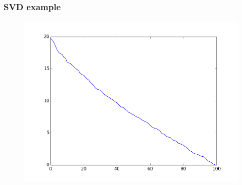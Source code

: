 \documentclass{beamer}
\begin{document}
\begin{frame}
\frametitle{SVD example}


\begin{figure}
\includegraphics[scale=0.25]{figs/svd_plot.png}
\end{figure}

\end{frame}
\end{document}
